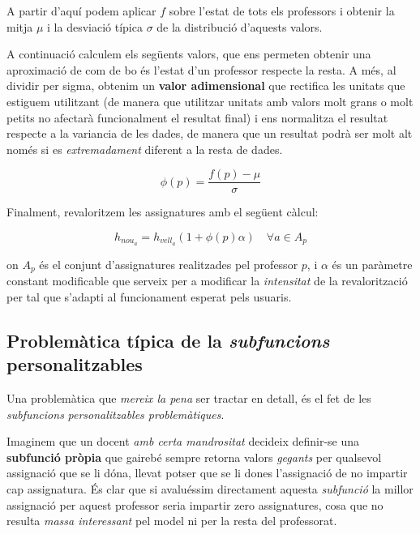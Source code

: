 \documentclass[10pt,twocolumn]{article}
\begin{document}
A partir d'aquí podem aplicar $f$ sobre l'estat de tots els professors i obtenir la mitja $\mu$ i la desviació típica $\sigma$ de la distribució d'aquests valors. 

A continuació calculem els següents valors, que ens permeten obtenir una aproximació de com de bo és l'estat d'un professor respecte la resta. A més, al dividir per sigma, obtenim un \textbf{valor adimensional} que rectifica les unitats que estiguem utilitzant (de manera que utilitzar unitats amb valors molt grans o molt petits no afectarà funcionalment el resultat final) i ens normalitza el resultat respecte a la variancia de les dades, de manera que un resultat podrà ser molt alt només si es \textit{extremadament} diferent a la resta de dades.

$$\phi(p)=\dfrac{f(p)-\mu}{\sigma}$$

Finalment, revaloritzem les assignatures amb el següent càlcul:

$$h_{nou_a}=h_{vell_a}(1+\phi(p)\alpha) \quad \forall a \in A_p$$

on $A_p$ és el conjunt d'assignatures realitzades pel professor $p$, i $\alpha$ és un paràmetre constant modificable que serveix per a modificar la \textit{intensitat} de la revalorització per tal que s'adapti al funcionament esperat pels usuaris.
\subsection{Problemàtica típica de la \textit{subfuncions} personalitzables}

Una problemàtica que \textit{mereix la pena} ser tractar en detall, és el fet de les \textit{subfuncions} \textit{personalitzables problemàtiques}.

Imaginem que un docent \textit{amb certa mandrositat} decideix definir-se una \textbf{subfunció pròpia} que gairebé sempre retorna valors \textit{gegants} per  qualsevol assignació que se li dóna, llevat  potser que se li dones l'assignació de no impartir cap assignatura. És clar que si avaluéssim directament aquesta \textit{subfunció} la millor assignació per aquest professor seria impartir zero assignatures, cosa que no resulta \textit{massa interessant} pel model ni per la resta del professorat.
\end{document}
